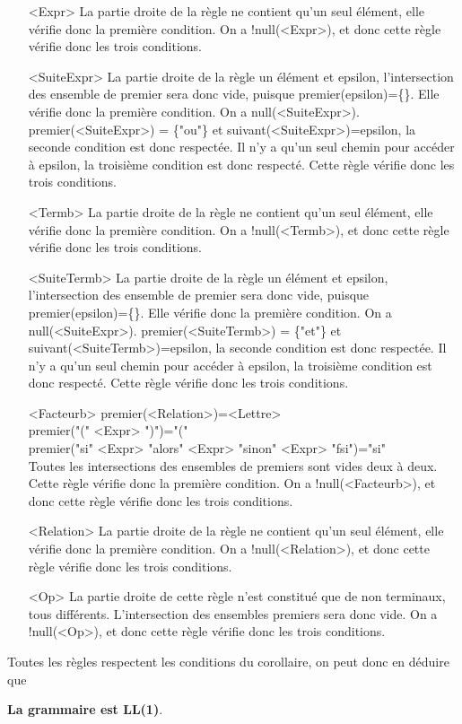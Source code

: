 \documentclass[11pt]{article} %
\begin{document}
\begin{enumerate}
\item[<Expr>] La partie droite de la règle ne contient qu'un seul élément, elle vérifie donc la première condition. On a !null(<Expr>), et donc cette règle vérifie donc les trois conditions.
\item[<SuiteExpr>] La partie droite de la règle un élément et epsilon, l'intersection des ensemble de premier sera donc vide, puisque premier(epsilon)=\{\}. Elle vérifie donc la première condition. On a null(<SuiteExpr>). premier(<SuiteExpr>) = \{"ou"\} et suivant(<SuiteExpr>)=epsilon, la seconde condition est donc respectée. Il n'y a qu'un seul chemin pour accéder à epsilon, la troisième condition est donc respecté. Cette règle vérifie donc les trois conditions.
\item[<Termb>] La partie droite de la règle ne contient qu'un seul élément, elle vérifie donc la première condition. On a !null(<Termb>), et donc cette règle vérifie donc les trois conditions.
\item[<SuiteTermb>] La partie droite de la règle un élément et epsilon, l'intersection des ensemble de premier sera donc vide, puisque premier(epsilon)=\{\}. Elle vérifie donc la première condition. On a null(<SuiteExpr>). premier(<SuiteTermb>) = \{"et"\} et suivant(<SuiteTermb>)=epsilon, la seconde condition est donc respectée. Il n'y a qu'un seul chemin pour accéder à epsilon, la troisième condition est donc respecté. Cette règle vérifie donc les trois conditions.
\item[<Facteurb>] premier(<Relation>)={<Lettre>}\\
premier("(" <Expr> ")")={"("}\\
premier("si" <Expr> "alors" <Expr> "sinon" <Expr> "fsi")={"si"}\\
Toutes les intersections des ensembles de premiers sont vides deux à deux. Cette règle vérifie donc la première condition. On a !null(<Facteurb>), et donc cette règle vérifie donc les trois conditions.
\item[<Relation>] La partie droite de la règle ne contient qu'un seul élément, elle vérifie donc la première condition. On a !null(<Relation>), et donc cette règle vérifie donc les trois conditions.

\item[<Op>] La partie droite de cette règle n'est constitué que de non terminaux, tous différents. L'intersection des ensembles premiers sera donc vide. On a !null(<Op>), et donc cette règle vérifie donc les trois conditions.
\end{enumerate}
Toutes les règles respectent les conditions du corollaire, on peut donc en déduire que \\
	\begin{center}
		\textbf{La grammaire est LL(1)}.
	\end{center}
\end{document}
